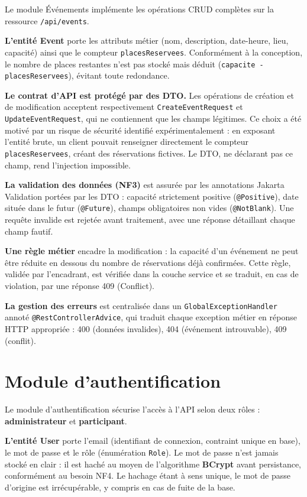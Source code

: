 \documentclass[12pt,a4paper]{report}
\newcommand{\code}[1]{\textcolor{codecolor}{\texttt{#1}}}
\begin{document}
Le module Événements implémente les opérations CRUD complètes sur la ressource \code{/api/events}.

\textbf{L'entité Event} porte les attributs métier (nom, description, date-heure, lieu, capacité) ainsi que le compteur \code{placesReservees}. Conformément à la conception, le nombre de places restantes n'est pas stocké mais déduit (\code{capacite - placesReservees}), évitant toute redondance.

\textbf{Le contrat d'API est protégé par des DTO.} Les opérations de création et de modification acceptent respectivement \code{CreateEventRequest} et \code{UpdateEventRequest}, qui ne contiennent que les champs légitimes. Ce choix a été motivé par un risque de sécurité identifié expérimentalement : en exposant l'entité brute, un client pouvait renseigner directement le compteur \code{placesReservees}, créant des réservations fictives. Le DTO, ne déclarant pas ce champ, rend l'injection impossible.

\textbf{La validation des données (NF3)} est assurée par les annotations Jakarta Validation portées par les DTO : capacité strictement positive (\code{@Positive}), date située dans le futur (\code{@Future}), champs obligatoires non vides (\code{@NotBlank}). Une requête invalide est rejetée avant traitement, avec une réponse détaillant chaque champ fautif.

\textbf{Une règle métier} encadre la modification : la capacité d'un événement ne peut être réduite en dessous du nombre de réservations déjà confirmées. Cette règle, validée par l'encadrant, est vérifiée dans la couche service et se traduit, en cas de violation, par une réponse 409 (Conflict).

\textbf{La gestion des erreurs} est centralisée dans un \code{GlobalExceptionHandler} annoté \code{@RestControllerAdvice}, qui traduit chaque exception métier en réponse HTTP appropriée : 400 (données invalides), 404 (événement introuvable), 409 (conflit).

\section{Module d'authentification}

Le module d'authentification sécurise l'accès à l'API selon deux rôles : \textbf{administrateur} et \textbf{participant}.

\textbf{L'entité User} porte l'email (identifiant de connexion, contraint unique en base), le mot de passe et le rôle (énumération \code{Role}). Le mot de passe n'est jamais stocké en clair : il est haché au moyen de l'algorithme \textbf{BCrypt} avant persistance, conformément au besoin NF4. Le hachage étant à sens unique, le mot de passe d'origine est irrécupérable, y compris en cas de fuite de la base.
\end{document}

